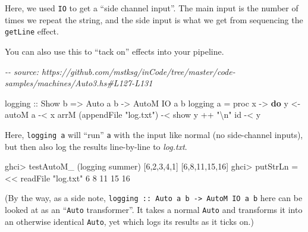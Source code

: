 \documentclass[]{article}
\newenvironment{Shaded}{}{}
\newcommand{\CommentTok}[1]{\textcolor[rgb]{0.38,0.63,0.69}{\textit{#1}}}
\newcommand{\DataTypeTok}[1]{\textcolor[rgb]{0.56,0.13,0.00}{#1}}
\newcommand{\DecValTok}[1]{\textcolor[rgb]{0.25,0.63,0.44}{#1}}
\newcommand{\FunctionTok}[1]{\textcolor[rgb]{0.02,0.16,0.49}{#1}}
\newcommand{\KeywordTok}[1]{\textcolor[rgb]{0.00,0.44,0.13}{\textbf{#1}}}
\newcommand{\NormalTok}[1]{#1}
\newcommand{\OperatorTok}[1]{\textcolor[rgb]{0.40,0.40,0.40}{#1}}
\newcommand{\OtherTok}[1]{\textcolor[rgb]{0.00,0.44,0.13}{#1}}
\newcommand{\StringTok}[1]{\textcolor[rgb]{0.25,0.44,0.63}{#1}}
\begin{document}
Here, we used \texttt{IO} to get a ``side channel input''. The main input is the
number of times we repeat the string, and the side input is what we get from
sequencing the \texttt{getLine} effect.

You can also use this to ``tack on'' effects into your pipeline.

\begin{Shaded}
\begin{Highlighting}[]
\CommentTok{{-}{-} source: https://github.com/mstksg/inCode/tree/master/code{-}samples/machines/Auto3.hs\#L127{-}L131}

\OtherTok{logging ::} \DataTypeTok{Show}\NormalTok{ b }\OtherTok{=>} \DataTypeTok{Auto}\NormalTok{ a b }\OtherTok{{-}>} \DataTypeTok{AutoM} \DataTypeTok{IO}\NormalTok{ a b}
\NormalTok{logging a }\OtherTok{=}\NormalTok{ proc x }\OtherTok{{-}>} \KeywordTok{do}
\NormalTok{    y }\OtherTok{<{-}}\NormalTok{ autoM a }\OperatorTok{{-}<}\NormalTok{ x}
\NormalTok{    arrM (}\FunctionTok{appendFile} \StringTok{"log.txt"}\NormalTok{) }\OperatorTok{{-}<} \FunctionTok{show}\NormalTok{ y }\OperatorTok{++} \StringTok{"\textbackslash{}n"}
    \FunctionTok{id} \OperatorTok{{-}<}\NormalTok{ y}
\end{Highlighting}
\end{Shaded}

Here, \texttt{logging\ a} will ``run'' \texttt{a} with the input like normal (no
side-channel inputs), but then also log the results line-by-line to
\emph{log.txt}.

\begin{Shaded}
\begin{Highlighting}[]
\NormalTok{ghci}\OperatorTok{>}\NormalTok{ testAutoM\_ (logging summer) [}\DecValTok{6}\NormalTok{,}\DecValTok{2}\NormalTok{,}\DecValTok{3}\NormalTok{,}\DecValTok{4}\NormalTok{,}\DecValTok{1}\NormalTok{]}
\NormalTok{[}\DecValTok{6}\NormalTok{,}\DecValTok{8}\NormalTok{,}\DecValTok{11}\NormalTok{,}\DecValTok{15}\NormalTok{,}\DecValTok{16}\NormalTok{]}
\NormalTok{ghci}\OperatorTok{>} \FunctionTok{putStrLn} \OperatorTok{=<<} \FunctionTok{readFile} \StringTok{"log.txt"}
\DecValTok{6}
\DecValTok{8}
\DecValTok{11}
\DecValTok{15}
\DecValTok{16}
\end{Highlighting}
\end{Shaded}

(By the way, as a side note,
\texttt{logging\ ::\ Auto\ a\ b\ -\textgreater{}\ AutoM\ IO\ a\ b} here can be
looked at as an ``\texttt{Auto} transformer''. It takes a normal \texttt{Auto}
and transforms it into an otherwise identical \texttt{Auto}, yet which logs its
results as it ticks on.)
\end{document}
